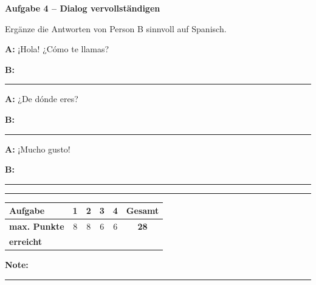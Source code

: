 \documentclass[11pt, a4paper]{article}
\newcommand{\punktebox}[1]{\hfill\fbox{\small \_\_\_/#1}}
\newcommand{\luecke}[1]{\rule{#1}{0.4pt}}
\begin{document}
\vspace{15pt}


\noindent\textbf{\textcolor{spanisch}{Aufgabe 4 -- Dialog vervollständigen}} \punktebox{6}

\noindent Ergänze die Antworten von Person B sinnvoll auf Spanisch.

\vspace{10pt}

\noindent
\textbf{A:} ¡Hola! ¿Cómo te llamas?

\vspace{0.6em}
\noindent
\textbf{B:} \luecke{8cm}

\vspace{0.8em}
\noindent
\textbf{A:} ¿De dónde eres?

\vspace{0.6em}
\noindent
\textbf{B:} \luecke{8cm}

\vspace{0.8em}
\noindent
\textbf{A:} ¡Mucho gusto!

\vspace{0.6em}
\noindent
\textbf{B:} \luecke{8cm}


\vspace{20pt}
\hrule
\vspace{10pt}

\noindent
\begin{tabularx}{\textwidth}{|X|c|c|c|c||c|}
\hline
\textbf{Aufgabe} & 1 & 2 & 3 & 4 & \textbf{Gesamt} \\
\hline
\textbf{max. Punkte} & 8 & 8 & 6 & 6 & \textbf{28} \\
\hline
\textbf{erreicht} & & & & & \\[0.6em]
\hline
\end{tabularx}

\vspace{10pt}

\begin{flushright}
\textbf{Note:} \luecke{2cm}
\end{flushright}
\end{document}
